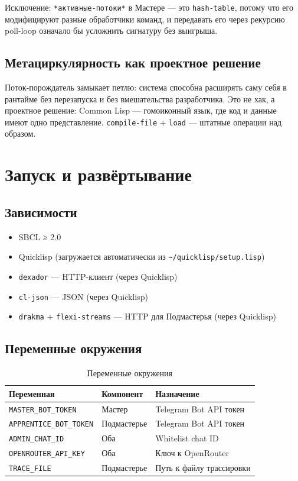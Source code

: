 \documentclass[11pt,a4paper]{article}
\begin{document}
Исключение: \texttt{*активные-потоки*} в Мастере — это \texttt{hash-table}, потому что его модифицируют разные обработчики команд, и передавать его через рекурсию poll-loop означало бы усложнить сигнатуру без выигрыша.

\subsection{Метациркулярность как проектное решение}

Поток-порождатель замыкает петлю: система способна расширять саму себя в рантайме без перезапуска и без вмешательства разработчика. Это не хак, а проектное решение: Common Lisp — гомоиконный язык, где код и данные имеют одно представление. \texttt{compile-file} + \texttt{load} — штатные операции над образом.

\section{Запуск и развёртывание}

\subsection{Зависимости}

\begin{itemize}[noitemsep]
  \item SBCL ≥ 2.0
  \item Quicklisp (загружается автоматически из \texttt{\textasciitilde/quicklisp/setup.lisp})
  \item \texttt{dexador} — HTTP-клиент (через Quicklisp)
  \item \texttt{cl-json} — JSON (через Quicklisp)
  \item \texttt{drakma} + \texttt{flexi-streams} — HTTP для Подмастерья (через Quicklisp)
\end{itemize}

\subsection{Переменные окружения}

\begin{table}[H]
\centering\small
\begin{tabular}{lll}
\toprule
\textbf{Переменная} & \textbf{Компонент} & \textbf{Назначение} \\
\midrule
\texttt{MASTER\_BOT\_TOKEN}     & Мастер       & Telegram Bot API токен \\
\texttt{APPRENTICE\_BOT\_TOKEN} & Подмастерье  & Telegram Bot API токен \\
\texttt{ADMIN\_CHAT\_ID}        & Оба          & Whitelist chat ID \\
\texttt{OPENROUTER\_API\_KEY}   & Оба          & Ключ к OpenRouter \\
\texttt{TRACE\_FILE}            & Подмастерье  & Путь к файлу трассировки \\
\bottomrule
\end{tabular}
\caption{Переменные окружения}
\end{table}
\end{document}
